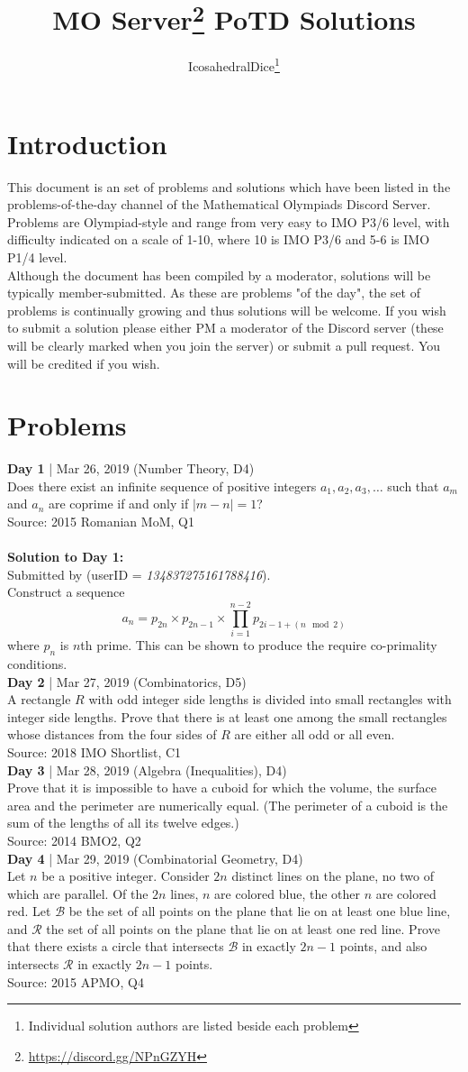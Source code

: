 \documentclass{article}
\title{MO Server\thanks{\url{https://discord.gg/NPnGZYH}} PoTD Solutions}
\author{IcosahedralDice\thanks{Individual solution authors are listed beside each problem}}
\newcommand{\problem}[6]{
\textbf{Day #1} | #2 (#5, D#6)\\
#4 \\
Source: #3\\
}
\newcommand{\solution}[4]{
\textbf{Solution to Day #1:}\\
Submitted by \textit{#2} (userID = \textit{#3}). \\
#4\\
}
\begin{document}
\maketitle
\section{Introduction}
This document is an set of problems and solutions which have been listed in the problems-of-the-day channel of the Mathematical Olympiads Discord Server. Problems are Olympiad-style and range from very easy to IMO P3/6 level, with difficulty indicated on a scale of 1-10, where 10 is IMO P3/6 and 5-6 is IMO P1/4 level. \\
Although the document has been compiled by a moderator, solutions will be typically member-submitted. As these are problems "of the day", the set of problems is continually growing and thus solutions will be welcome. If you wish to submit a solution please either PM a moderator of the Discord server (these will be clearly marked when you join the server) or submit a pull request. You will be credited if you wish. 

\section{Problems}
\problem{1}{Mar 26, 2019}{2015 Romanian MoM, Q1}{Does there exist an infinite sequence of positive integers $a_1, a_2, a_3, \dots$ such that $a_m$ and $a_n$ are coprime if and only if $\vert m - n \vert = 1$?}{Number Theory}{4}\\
\solution{1}{}{134837275161788416}{Construct a sequence $$a_n = p_{2n}\times p_{2n-1}\times \prod_{i=1}^{n-2} {p_{2i-1+(n \mod 2)}}$$ where $p_n$ is $n$th prime. This can be shown to produce the require co-primality conditions.}

\problem{2}{Mar 27, 2019}{2018 IMO Shortlist, C1}{A rectangle $R$ with odd integer side lengths is divided into small rectangles with integer side lengths. Prove that there is at least one among the small rectangles whose distances from the four sides of $R$ are either all odd or all even.}{Combinatorics}{5}

\problem{3}{Mar 28, 2019}{2014 BMO2, Q2}{Prove that it is impossible to have a cuboid for which the volume, the surface area and the perimeter are numerically equal. (The perimeter of a cuboid is the sum of the lengths of all its twelve edges.)}{Algebra (Inequalities)}{4}

\problem{4}{Mar 29, 2019}{2015 APMO, Q4}{Let $n$ be a positive integer. Consider $2n$ distinct lines on the plane, no two of which are parallel. Of the $2n$ lines, $n$ are colored blue, the other $n$ are colored red. Let $\mathcal{B}$ be the set of all points on the plane that lie on at least one blue line, and $\mathcal{R}$ the set of all points on the plane that lie on at least one red line. Prove that there exists a circle that intersects $\mathcal{B}$ in exactly $2n-1$ points, and also intersects $\mathcal{R}$ in exactly $2n-1$ points.}{Combinatorial Geometry}{4}
\end{document}
